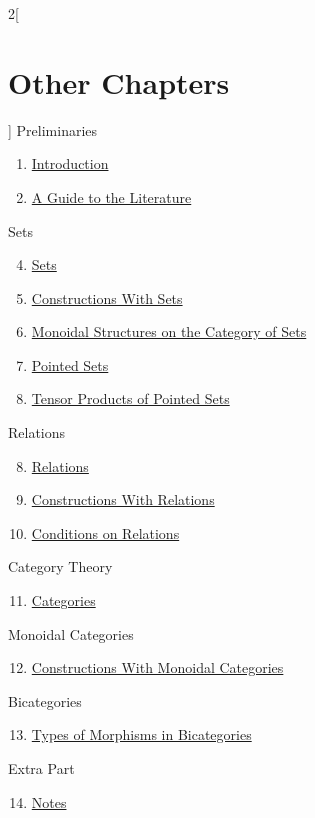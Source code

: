 \begin{multicols}{2}[\section{Other Chapters}]
\noindent
Preliminaries
\begin{enumerate}
\item \hyperref[introduction:section-phantom]{Introduction}
\item \hyperref[a-guide-to-the-literature:section-phantom]{A Guide to the Literature}
\end{enumerate}
Sets
\begin{enumerate}
\setcounter{enumi}{3}
\item \hyperref[sets:section-phantom]{Sets}
\item \hyperref[constructions-with-sets:section-phantom]{Constructions With Sets}
\item \hyperref[monoidal-structures-on-the-category-of-sets:section-phantom]{Monoidal Structures on the Category of Sets}
\item \hyperref[pointed-sets:section-phantom]{Pointed Sets}
\item \hyperref[tensor-products-of-pointed-sets:section-phantom]{Tensor Products of Pointed Sets}
\end{enumerate}
Relations
\begin{enumerate}
\setcounter{enumi}{7}
\item \hyperref[relations:section-phantom]{Relations}
\item \hyperref[constructions-with-relations:section-phantom]{Constructions With Relations}
\item \hyperref[conditions-on-relations:section-phantom]{Conditions on Relations}
\end{enumerate}
Category Theory
\begin{enumerate}
\setcounter{enumi}{10}
\item \hyperref[categories:section-phantom]{Categories}
\end{enumerate}
Monoidal Categories
\begin{enumerate}
\setcounter{enumi}{11}
\item \hyperref[constructions-with-monoidal-categories:section-phantom]{Constructions With Monoidal Categories}
\end{enumerate}
Bicategories
\begin{enumerate}
\setcounter{enumi}{12}
\item \hyperref[types-of-morphisms-in-bicategories:section-phantom]{Types of Morphisms in Bicategories}
\end{enumerate}
Extra Part
\begin{enumerate}
\setcounter{enumi}{13}
\item \hyperref[notes:section-phantom]{Notes}
\end{enumerate}
\end{multicols}
